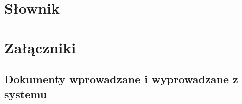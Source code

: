 \documentclass[paper=a4, fontsize=12pt]{scrartcl}
\numberwithin{equation}{section}		%
\numberwithin{figure}{section}			%
\numberwithin{table}{section}				%
\begin{document}




\section{Słownik}
	

\section{Załączniki}
	\subsection{Dokumenty wprowadzane i wyprowadzane z systemu}
		
		
\end{document}
